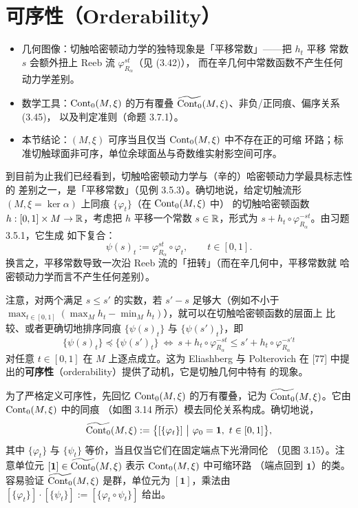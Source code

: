 \section{可序性（Orderability）}

\begin{keytakeaways}
\begin{itemize}
  \item 几何图像：切触哈密顿动力学的独特现象是「平移常数」——把 $h_t$ 平移
        常数 $s$ 会额外扭上 Reeb 流 $\varphi_{R_\alpha}^{st}$（见 (3.42)），
        而在辛几何中常数函数不产生任何动力学差别。
  \item 数学工具：$\operatorname{Cont}_0(M,\xi)$ 的万有覆叠
        $\widetilde{\operatorname{Cont}_0}(M,\xi)$、非负/正同痕、偏序关系 (3.45)，
        以及判定准则（命题 3.7.1）。
  \item 本节结论：$(M,\xi)$ 可序当且仅当 $\operatorname{Cont}_0(M,\xi)$ 中不存在正的可缩
        环路；标准切触球面非可序，单位余球面丛与奇数维实射影空间可序。
\end{itemize}
\end{keytakeaways}

到目前为止我们已经看到，切触哈密顿动力学与（辛的）哈密顿动力学最具标志性的
差别之一，是「平移常数」（见例 3.5.3）。确切地说，给定切触流形
$(M,\xi=\ker\alpha)$ 上同痕 $\{\varphi_t\}$（在 $\operatorname{Cont}_0(M,\xi)$ 中）
的切触哈密顿函数 $h:[0,1]\times M\to\mathbb{R}$，考虑把 $h$ 平移一个常数
$s\in\mathbb{R}$，形式为 $s+h_t\circ\varphi_{R_\alpha}^{-st}$。由习题 3.5.1，它生成
如下复合：
\begin{equation}\tag{3.42}
  \psi(s)_t:=\varphi_{R_\alpha}^{st}\circ\varphi_t,
  \qquad t\in[0,1].
\end{equation}
换言之，平移常数导致一次沿 Reeb 流的「扭转」（而在辛几何中，平移常数就
哈密顿动力学而言不产生任何差别）。

注意，对两个满足 $s\le s'$ 的实数，若 $s'-s$ 足够大（例如不小于
$\max_{t\in[0,1]}(\max_M h_t-\min_M h_t)$），就可以在切触哈密顿函数的层面上
比较、或者更确切地排序同痕 $\{\psi(s)_t\}$ 与 $\{\psi(s')_t\}$，即
\begin{equation}\tag{3.43}
  \{\psi(s)_t\}\preceq\{\psi(s')_t\}
  \ \Longleftrightarrow\
  s+h_t\circ\varphi_{R_\alpha}^{-st}
  \le s'+h_t\circ\varphi_{R_\alpha}^{-s't}
\end{equation}
对任意 $t\in[0,1]$ 在 $M$ 上逐点成立。这为 Eliashberg 与 Polterovich 在
[77] 中提出的\textbf{可序性}（orderability）提供了动机，它是切触几何中特有
的现象。

为了严格定义可序性，先回忆 $\operatorname{Cont}_0(M,\xi)$ 的万有覆叠，记为
$\widetilde{\operatorname{Cont}_0}(M,\xi)$。它由 $\operatorname{Cont}_0(M,\xi)$ 中的同痕
（如图 3.14 所示）模去同伦关系构成。确切地说，
\[
  \widetilde{\Op{Cont}_0}(M,\xi)
  :=\bigl\{[\{\varphi_t\}]\ \big|\ \varphi_0=\mathbf{1},\ t\in[0,1]\bigr\},
\]
其中 $\{\varphi_t\}$ 与 $\{\psi_t\}$ 等价，当且仅当它们在固定端点下光滑同伦
（见图 3.15）。注意单位元 $[\mathbf{1}]
\in\widetilde{\operatorname{Cont}_0}(M,\xi)$ 表示 $\operatorname{Cont}_0(M,\xi)$ 中可缩环路
（端点回到 $\mathbf{1}$）的类。容易验证
$\widetilde{\operatorname{Cont}_0}(M,\xi)$ 是群，单位元为 $[\mathbf{1}]$，乘法由
$[\{\varphi_t\}]\cdot[\{\psi_t\}]:=[\{\varphi_t\circ\psi_t\}]$ 给出。

